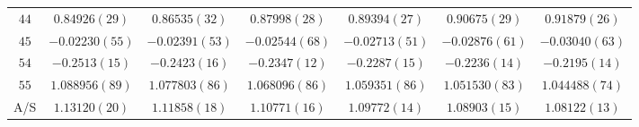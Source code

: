 \begin{table}
\begin{center}
\begin{tabular}{c|c c c c c c}
$44$ & $0.84926(29)$ & $0.86535(32)$ & $0.87998(28)$ & $0.89394(27)$ & $0.90675(29)$ & $0.91879(26)$ \\
$45$ & $-0.02230(55)$ & $-0.02391(53)$ & $-0.02544(68)$ & $-0.02713(51)$ & $-0.02876(61)$ & $-0.03040(63)$ \\
$54$ & $-0.2513(15)$ & $-0.2423(16)$ & $-0.2347(12)$ & $-0.2287(15)$ & $-0.2236(14)$ & $-0.2195(14)$ \\
$55$ & $1.088956(89)$ & $1.077803(86)$ & $1.068096(86)$ & $1.059351(86)$ & $1.051530(83)$ & $1.044488(74)$ \\
\hline
A/S & $1.13120(20)$ & $1.11858(18)$ & $1.10771(16)$ & $1.09772(14)$ & $1.08903(15)$ & $1.08122(13)$ \\
\hline
\hline
\end{tabular}
\end{center}
\end{table}